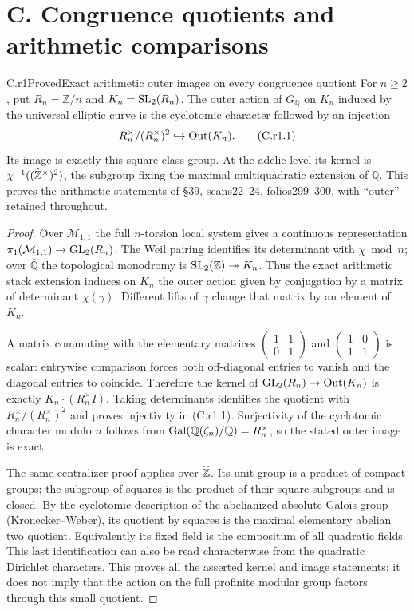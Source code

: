 \section{C. Congruence quotients and arithmetic comparisons}

\begin{claim}{C.r1}{Proved}{Exact arithmetic outer images on every congruence quotient}
For $n\ge2$, put $R_n=\mathbb Z/n$ and $K_n=\operatorname{SL}_2(R_n)$.
The outer action of $G_\mathbb Q$ on $K_n$ induced by the universal
elliptic curve is the cyclotomic character followed by an injection
\[
 R_n^\times/(R_n^\times)^2\hookrightarrow\operatorname{Out}(K_n).
 \tag{C.r1.1}
\]
Its image is exactly this square-class group. At the adelic level its
kernel is $\chi^{-1}((\widehat{\mathbb Z}^\times)^2)$, the subgroup fixing the
maximal multiquadratic extension of $\mathbb Q$. This proves the
arithmetic statements of \S39, scans22--24, folios299--300, with
``outer'' retained throughout.
\end{claim}
\begin{proof}
Over $\mathcal M_{1,1}$ the full $n$-torsion local system gives a
continuous representation
$\pi_1(\mathcal M_{1,1})\to\operatorname{GL}_2(R_n)$.
The Weil pairing identifies its determinant with $\chi\bmod n$;
over $\overline{\mathbb Q}$ the topological monodromy is
$\operatorname{SL}_2(\mathbb Z)\twoheadrightarrow K_n$.
Thus the exact arithmetic stack extension induces on $K_n$ the outer
action given by conjugation by a matrix of determinant $\chi(\gamma)$.
Different lifts of $\gamma$ change that matrix by an element of $K_n$.

A matrix commuting with the elementary matrices
$\left(\begin{smallmatrix}1&1\\0&1\end{smallmatrix}\right)$ and
$\left(\begin{smallmatrix}1&0\\1&1\end{smallmatrix}\right)$ is scalar:
entrywise comparison forces both off-diagonal entries to vanish and
the diagonal entries to coincide. Therefore the kernel of
$\operatorname{GL}_2(R_n)\to\operatorname{Out}(K_n)$ is exactly
$K_n\cdot(R_n^\times I)$. Taking determinants identifies the quotient
with $R_n^\times/(R_n^\times)^2$ and proves injectivity in (C.r1.1).
Surjectivity of the cyclotomic character modulo $n$ follows from
$\operatorname{Gal}(\mathbb Q(\zeta_n)/\mathbb Q)=R_n^\times$, so the stated outer
image is exact.

The same centralizer proof applies over $\widehat{\mathbb Z}$. Its unit group is a
product of compact groups; the subgroup of squares is the product of
their square subgroups and is closed. By the cyclotomic description of
the abelianized absolute Galois group (Kronecker--Weber), its quotient
by squares is the maximal elementary abelian two quotient. Equivalently
its fixed field is the compositum of all quadratic fields. This last
identification can also be read characterwise from the quadratic
Dirichlet characters. This proves all the asserted kernel and image
statements; it does not imply that the action on the full profinite
modular group factors through this small quotient.
\end{proof}



